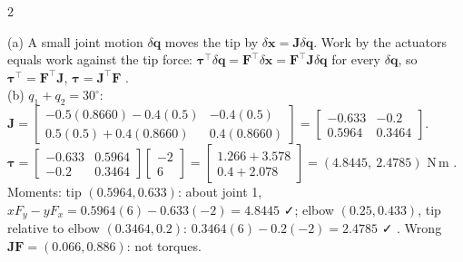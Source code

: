 \begin{multicols}{2}
\begin{examq}[Q6: derive $\boldsymbol\tau=\mathbf J^\top\mathbf F$, then use it \mk{marks assumed 6}]
\solution
(a) A small joint motion $\delta\mathbf q$ moves the tip by $\delta\mathbf x=\mathbf J\delta\mathbf q$. Work by the actuators equals work against the tip force: $\boldsymbol\tau^\top\delta\mathbf q=\mathbf F^\top\delta\mathbf x=\mathbf F^\top\mathbf J\delta\mathbf q$ for every $\delta\mathbf q$, so $\boldsymbol\tau^\top=\mathbf F^\top\mathbf J$, $\boldsymbol\tau=\mathbf J^\top\mathbf F$ .\\
(b) $q_1+q_2=30^\circ$: $\mathbf J=\begin{bmatrix}-0.5(0.8660)-0.4(0.5)&-0.4(0.5)\\0.5(0.5)+0.4(0.8660)&0.4(0.8660)\end{bmatrix}=\begin{bmatrix}-0.633&-0.2\\0.5964&0.3464\end{bmatrix}$. $\boldsymbol\tau=\begin{bmatrix}-0.633&0.5964\\-0.2&0.3464\end{bmatrix}\begin{bmatrix}-2\\6\end{bmatrix}=\begin{bmatrix}1.266+3.578\\0.4+2.078\end{bmatrix}=(4.8445,\ 2.4785)$ N\,m . Moments: tip $(0.5964,0.633)$: about joint 1, $xF_y-yF_x=0.5964(6)-0.633(-2)=4.8445$ ✓; elbow $(0.25,0.433)$, tip relative to elbow $(0.3464,0.2)$: $0.3464(6)-0.2(-2)=2.4785$ ✓ . Wrong $\mathbf J\mathbf F=(0.066,0.886)$: not torques. \chk
\end{examq}

\end{multicols}
